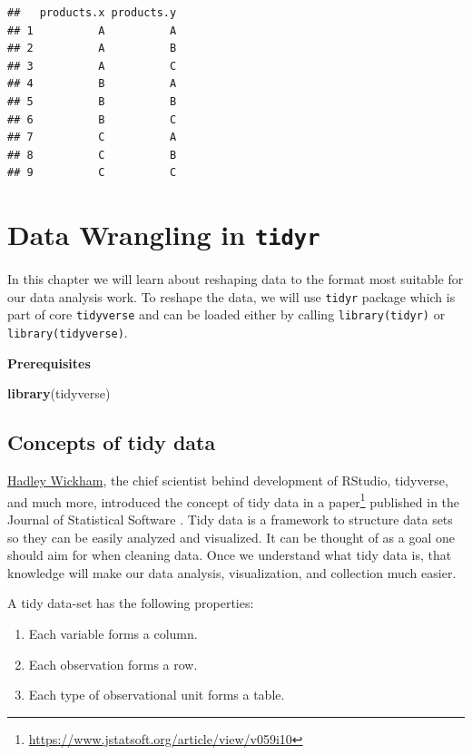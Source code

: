 \documentclass[
]{book}
\newenvironment{Shaded}{\begin{snugshade}}{\end{snugshade}}
\newcommand{\FunctionTok}[1]{\textcolor[rgb]{0.13,0.29,0.53}{\textbf{#1}}}
\newcommand{\NormalTok}[1]{#1}
\providecommand{\tightlist}{%
  \setlength{\itemsep}{0pt}\setlength{\parskip}{0pt}}
\begin{document}
\begin{verbatim}
##   products.x products.y
## 1          A          A
## 2          A          B
## 3          A          C
## 4          B          A
## 5          B          B
## 6          B          C
## 7          C          A
## 8          C          B
## 9          C          C
\end{verbatim}

\hypertarget{data-wrangling-in-tidyr}{%
\chapter{\texorpdfstring{Data Wrangling in \texttt{tidyr}}{Data Wrangling in tidyr}}\label{data-wrangling-in-tidyr}}

In this chapter we will learn about reshaping data to the format most suitable for our data analysis work. To reshape the data, we will use \texttt{tidyr} package \citep{R-tidyr} which is part of core \texttt{tidyverse} and can be loaded either by calling \texttt{library(tidyr)} or \texttt{library(tidyverse)}.

\textbf{Prerequisites}

\begin{Shaded}
\begin{Highlighting}[]
\FunctionTok{library}\NormalTok{(tidyverse)}
\end{Highlighting}
\end{Shaded}

\hypertarget{concepts-of-tidy-data}{%
\section{Concepts of tidy data}\label{concepts-of-tidy-data}}

\href{https://hadley.nz/}{Hadley Wickham}, the chief scientist behind development of RStudio, tidyverse, and much more, introduced the concept of tidy data in a paper\footnote{\url{https://www.jstatsoft.org/article/view/v059i10}} published in the Journal of Statistical Software \citep{JSSv059i10}. Tidy data is a framework to structure data sets so they can be easily analyzed and visualized. It can be thought of as a goal one should aim for when cleaning data. Once we understand what tidy data is, that knowledge will make our data analysis, visualization, and collection much easier. \citep{JSSv021i12}

A tidy data-set has the following properties:

\begin{enumerate}
\def\labelenumi{\arabic{enumi}.}
\tightlist
\item
  Each variable forms a column.
\item
  Each observation forms a row.
\item
  Each type of observational unit forms a table.
\end{enumerate}
\end{document}
